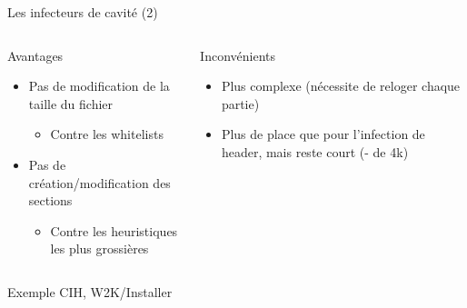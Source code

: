 \documentclass{beamer}
\begin{document}
\begin{frame}{Les infecteurs de cavité (2)}
\begin{columns}[t]
\begin{column}{5cm}
Avantages
\begin{itemize}
\item Pas de modification de la taille du fichier
\begin{itemize}
\item Contre les whitelists
\end{itemize}
\item Pas de création/modification des sections
\begin{itemize}
\item Contre les heuristiques les plus grossières
\end{itemize}
\end{itemize}
\end{column}
\begin{column}{5cm}
Inconvénients
\begin{itemize}
\item Plus complexe (nécessite de reloger chaque partie)
\item Plus de place que pour l'infection de header, mais reste court (- de 4k)
\end{itemize}
\end{column}
\end{columns}
\begin{alertblock}{Exemple}
CIH, W2K/Installer 
\end{alertblock}
\end{frame}
\end{document}

